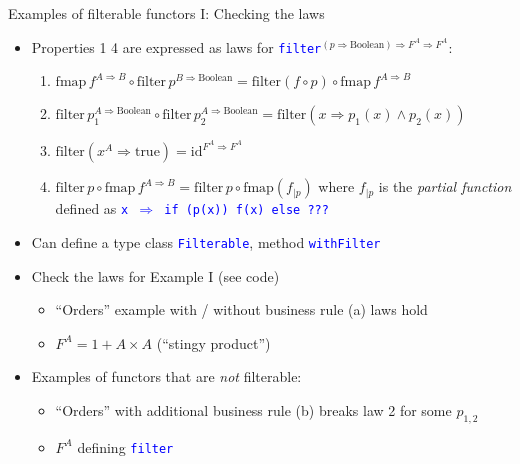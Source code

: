 \documentclass[english]{beamer}
\begin{document}
\begin{frame}{Examples of filterable functors I: Checking the laws}

\begin{itemize}
\item Properties 1 \textendash{} 4 are expressed as laws for \texttt{\textcolor{blue}{\footnotesize{}filter}}$^{(p\Rightarrow\text{Boolean})\Rightarrow F^{A}\Rightarrow F^{A}}$:
\begin{enumerate}
\item {\footnotesize{}$\text{fmap}\,f^{A\Rightarrow B}\circ\text{filter}\,p^{B\Rightarrow\text{Boolean}}=\text{filter}\left(f\circ p\right)\circ\text{fmap}\,f^{A\Rightarrow B}$}{\footnotesize \par}
\item {\footnotesize{}$\text{filter}\,p_{1}^{A\Rightarrow\text{Boolean}}\circ\text{filter}\,p_{2}^{A\Rightarrow\text{Boolean}}=\text{filter}\left(x\Rightarrow p_{1}(x)\wedge p_{2}(x)\right)$}{\footnotesize \par}
\item {\footnotesize{}$\text{filter}\left(x^{A}\Rightarrow\text{true}\right)=\text{id}^{F^{A}\Rightarrow F^{A}}$ }{\footnotesize \par}
\item {\footnotesize{}$\text{filter}\,p\circ\text{fmap}\,f^{A\Rightarrow B}=\text{filter}\,p\circ\text{fmap}\left(f_{|p}\right)$
}where {\footnotesize{}$f_{|p}$} is the \emph{partial function} defined
as \texttt{\textcolor{blue}{\footnotesize{}x $\Rightarrow$ if (p(x))
f(x) else ???}} 
\end{enumerate}
\item Can define a type class \texttt{\textcolor{blue}{\footnotesize{}Filterable}},
method \texttt{\textcolor{blue}{\footnotesize{}withFilter}} 
\item Check the laws for Example I (see code)
\begin{itemize}
\item ``Orders'' example with / without business rule (a) \textendash{}
laws hold
\item $F^{A}=1+A\times A$ (``stingy product'')
\end{itemize}
\item Examples of functors that are \emph{not} filterable:
\begin{itemize}
\item ``Orders'' with additional business rule (b) \textendash{} breaks
law 2 for some $p_{1,2}$
\item $F^{A}$ defining \texttt{\textcolor{blue}{\footnotesize{}filter}}

\end{itemize}
\end{itemize}
\end{frame}
\end{document}
